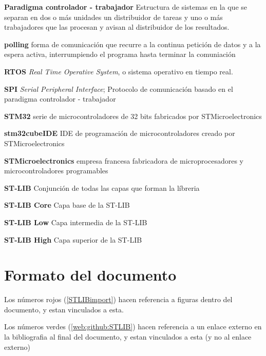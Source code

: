 \documentclass{report}
\begin{document}
\textbf{Paradigma controlador - trabajador} Estructura de sistemas en la que se separan en dos o más unidades un distribuidor de tareas y uno o más trabajadores que las procesan y avisan al distribuidor de los resultados. 
\par \vspace{0.2 cm}
\textbf{polling} forma de comunicación que recurre a la continua petición de datos y a la espera activa, interrumpiendo el programa hasta terminar la comuniación
\par \vspace{0.2 cm}
\textbf{RTOS} \textit{Real Time Operative System}, o sistema operativo en tiempo real.  
\par \vspace{0.2 cm}
\textbf{SPI} \textit{Serial Peripheral Interface}; Protocolo de comunicación basado en el paradigma controlador - trabajador
\par \vspace{0.2 cm}
\textbf{STM32} serie de microcontroladores de 32 bits fabricados por STMicroelectronics
\par \vspace{0.2 cm}
\textbf{stm32cubeIDE} IDE de programación de microcontroladores creado por STMicroelectronics
\par \vspace{0.2 cm}
\textbf{STMicroelectronics} empresa francesa fabricadora de microprocesadores y microcontroladores programables
\par \vspace{0.2 cm}
\textbf{ST-LIB} Conjunción de todas las capas que forman la líbreria
\par \vspace{0.2 cm}
\textbf{ST-LIB Core} Capa base de la ST-LIB
\par \vspace{0.2 cm}
\textbf{ST-LIB Low} Capa intermedia de la ST-LIB
\par \vspace{0.2 cm}
\textbf{ST-LIB High} Capa superior de la ST-LIB

\section{Formato del documento}
Los números rojos (\ref{STLIBimport}) hacen referencia a figuras dentro del documento, y estan vinculados a esta.
\par \vspace{0.2 cm}
Los números verdes (\ref{web:github:STLIB}) hacen referencia a un enlace externo en la bibliografia al final del documento, y estan vinculados a esta (y no al enlace externo)
\end{document}
